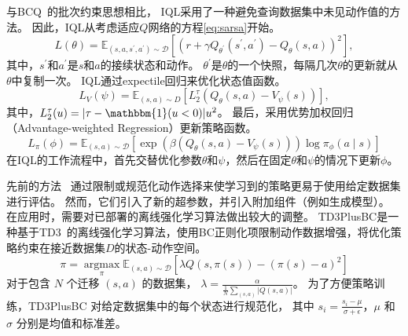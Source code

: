 与BCQ~\cite{DBLP:conf/icml/FujimotoMP19, DBLP:journals/corr/abs-1910-01708}的批次约束思想相比，
IQL采用了一种避免查询数据集中未见动作值的方法。
因此，IQL从考虑适应$Q$网络的方程\autoref{eq:sarsa}开始。
\begin{equation}
    L(\theta)=\mathbb{E}_{\left(s, a, s^{\prime}, a^{\prime}\right) \sim \mathcal{D}}\left[\left(r+\gamma Q_{\theta^\prime}\left(s^{\prime}, a^{\prime}\right)-Q_\theta(s, a)\right)^2\right], 
    \label{eq:sarsa}
\end{equation}
其中，$s^{\prime}$和$a^{\prime}$是$s$和$a$的接续状态和动作。
$\theta^\prime$是$\theta$的一个快照，每隔几次$\theta$的更新就从$\theta$中复制一次。
IQL通过expectile回归来优化状态值函数。
\begin{equation}
    L_V(\psi)=\mathbb{E}_{(s, a) \sim D}\left[L_2^\tau\left(Q_\theta(s, a)-V_\psi(s)\right)\right], \nonumber
\end{equation}
其中，$L_2^\tau(u)=|\tau-\mathbbm{1}(u<0)| u^2$。
最后，采用优势加权回归（Advantage-weighted Regression）更新策略函数。
\begin{equation}
    L_\pi(\phi)=\mathbb{E}_{(s, a) \sim \mathcal{D}}\left[\exp \left(\beta\left(Q_{\theta}(s, a)-V_\psi(s)\right)\right) \log \pi_\phi(a \mid s)\right]
\end{equation}
在IQL的工作流程中，首先交替优化参数$\theta$和$\psi$，然后在固定$\theta$和$\psi$的情况下更新$\phi$。

先前的方法~\cite{DBLP:conf/icml/FujimotoMP19, DBLP:journals/corr/abs-1910-01708, DBLP:conf/iclr/KostrikovNL22} 通过限制或规范化动作选择来使学习到的策略更易于使用给定数据集进行评估。
然而，它们引入了新的超参数，并引入附加组件（例如生成模型）。
在应用时，需要对已部署的离线强化学习算法做出较大的调整。
TD3PlusBC是一种基于TD3~\cite{DBLP:conf/icml/FujimotoHM18}的离线强化学习算法，使用BC正则化项限制动作数据增强，将优化策略约束在接近数据集$D$的状态-动作空间。
\begin{equation}
    \pi=\underset{\pi}{\operatorname{argmax}} \mathbb{E}_{(s, a) \sim \mathcal{D}}\left[\lambda Q(s, \pi(s))-(\pi(s)-a)^2\right]
\end{equation}
对于包含 $N$ 个迁移 $\left(s, a\right)$ 的数据集，
$\lambda=\frac{\alpha}{\frac{1}{N} \sum_{\left(s, a\right)}\left|Q\left(s, a\right)\right|}$。
为了方便策略训练，TD3PlusBC 对给定数据集中的每个状态进行规范化，
其中 $s_i=\frac{s_i-\mu}{\sigma+\epsilon}$，$\mu$ 和 $\sigma$ 分别是均值和标准差。

